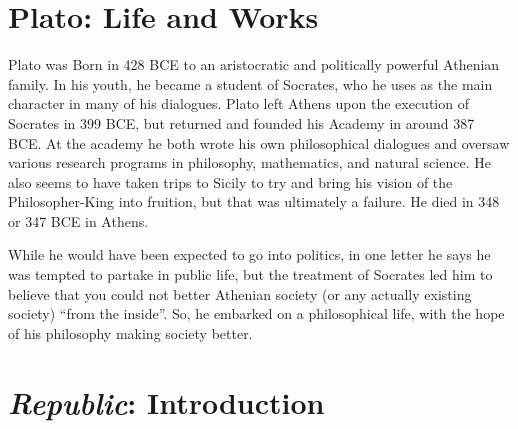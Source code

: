 \documentclass[oneside]{article}
\begin{document}
\thispagestyle{fancy}

\section*{Plato: Life and Works}

Plato was Born in 428 BCE to an aristocratic and politically powerful Athenian family. In his youth, he became a student of Socrates, who he uses as the main character in many of his dialogues. Plato left Athens upon the execution of Socrates in 399 BCE, but returned and founded his Academy in around 387 BCE. At the academy he both wrote his own philosophical dialogues and oversaw various research programs in philosophy, mathematics, and natural science. He also seems to have taken trips to Sicily to try and bring his vision of the Philosopher-King into fruition, but that was ultimately a failure. He died in 348 or 347 BCE in Athens.

While he would have been expected to go into politics, in one letter he says he was tempted to partake in public life, but the treatment of Socrates led him to believe that you could not better Athenian society (or any actually existing society) ``from the inside''. So, he embarked on a philosophical life, with the hope of his philosophy making society better.



\section*{\emph{Republic}: Introduction}
\end{document}
